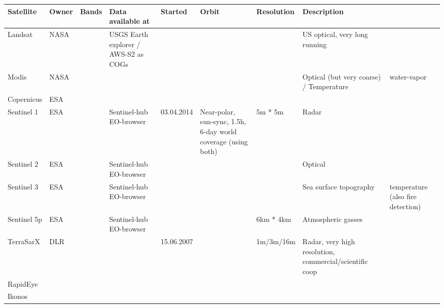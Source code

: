 \begin{table}[]
    \begin{tabular}{@{}llllll@{}}
    \toprule
    Satellite     & Owner & Bands & Data available at                    & Started    & Orbit                                                          & Resolution & Description                                   \\ \midrule
    Landsat       & NASA  &       & USGS Earth explorer / AWS-S2 as COGs &            &                                                                &            & US optical, very long running                           \\
    Modis         & NASA  &       &                                      &            &                                                                &            & Optical (but very coarse) / Temperature & water-vapor   \\
    Copernicus    & ESA   &       &                                      &            &                                                                &            &                                                         \\
    Sentinel 1    & ESA   &       & Sentinel-hub EO-browser              & 03.04.2014 & Near-polar, sun-sync, 1.5h, 6-day world coverage (using both)  & 5m * 5m    &  Radar                                                  \\
    Sentinel 2    & ESA   &       & Sentinel-hub EO-browser              &            &                                                                &            &  Optical                                                \\
    Sentinel 3    & ESA   &       & Sentinel-hub EO-browser              &            &                                                                &            &  Sea surface topography & temperature (also fire detection) \\
    Sentinel 5p   & ESA   &       & Sentinel-hub EO-browser              &            &                                                                & 6km * 4km  &  Atmospheric gasses                                     \\
    TerraSarX     & DLR   &       &                                      & 15.06.2007 &                                                                & 1m/3m/16m  &  Radar, very high resolution, commercial/scientific coop \\
    RapidEye      &       &       &                                      &            &                                                                &            &                                                         \\
    Ikonos        &       &       &                                      &            &                                                                &            &                                                         \\ \bottomrule
    \end{tabular}
\end{table}

